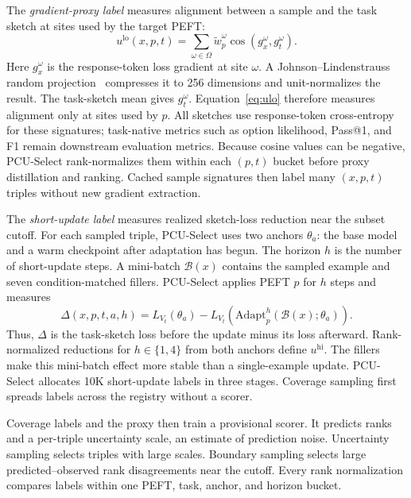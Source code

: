 The \emph{gradient-proxy label} measures alignment between a sample and the task sketch at sites used by the target PEFT:
\begin{equation}
  u^{\mathrm{lo}}(x,p,t)=\sum_{\omega\in\Omega}\tilde{w}_p^{\omega}
  \cos\!\left(g_x^{\omega},g_t^{\omega}\right).
  \label{eq:ulo}
\end{equation}
Here $g_x^{\omega}$ is the response-token loss gradient at site $\omega$. A Johnson--Lindenstrauss random projection~\cite{johnson1984jl} compresses it to 256 dimensions and unit-normalizes the result. The task-sketch mean gives $g_t^{\omega}$. Equation~\eqref{eq:ulo} therefore measures alignment only at sites used by $p$. All sketches use response-token cross-entropy for these signatures; task-native metrics such as option likelihood, Pass@1, and F1 remain downstream evaluation metrics. Because cosine values can be negative, PCU-Select rank-normalizes them within each $(p,t)$ bucket before proxy distillation and ranking. Cached sample signatures then label many $(x,p,t)$ triples without new gradient extraction.

The \emph{short-update label} measures realized sketch-loss reduction near the subset cutoff. For each sampled triple, PCU-Select uses two anchors $\theta_a$: the base model and a warm checkpoint after adaptation has begun. The horizon $h$ is the number of short-update steps. A mini-batch $\mathcal{B}(x)$ contains the sampled example and seven condition-matched fillers. PCU-Select applies PEFT $p$ for $h$ steps and measures
\begin{equation}
  \Delta(x,p,t,a,h)=L_{V_t}(\theta_a)-
  L_{V_t}\!\left(\mathrm{Adapt}^{h}_{p}(\mathcal{B}(x);\theta_a)\right).
  \label{eq:delta}
\end{equation}
Thus, $\Delta$ is the task-sketch loss before the update minus its loss afterward. Rank-normalized reductions for $h\in\{1,4\}$ from both anchors define $u^{\mathrm{hi}}$. The fillers make this mini-batch effect more stable than a single-example update. PCU-Select allocates 10K short-update labels in three stages. Coverage sampling first spreads labels across the registry without a scorer.

Coverage labels and the proxy then train a provisional scorer. It predicts ranks and a per-triple uncertainty scale, an estimate of prediction noise. Uncertainty sampling selects triples with large scales. Boundary sampling selects large predicted--observed rank disagreements near the cutoff. Every rank normalization compares labels within one PEFT, task, anchor, and horizon bucket.

